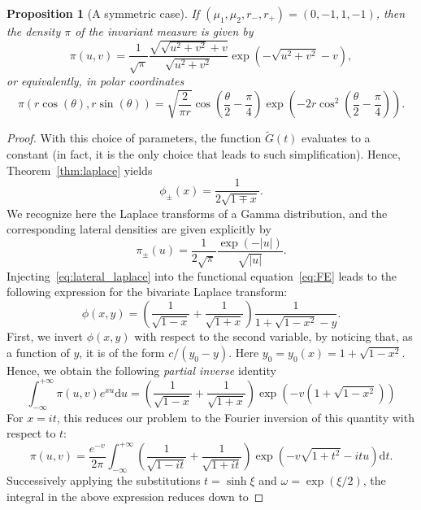 \documentclass{article}
\theoremstyle{plain}
\newtheorem{proposition}[theorem]{Proposition}
\theoremstyle{definition}
\theoremstyle{remark}
\begin{document}
\begin{proposition}[A symmetric case]\label{prop:ex} If $(\mu_1,\mu_2,r_-,r_+)=(0,-1,1,-1)$, then the density $\pi$ of the invariant measure is given by
$$\pi(u,v)=\frac{1}{\sqrt{\pi}}\frac{\sqrt{\sqrt{u^2+v^2}+v}}{\sqrt{u^2+v^2}}\exp\left(-\sqrt{u^2+v^2}-v\right),$$
or equivalently, in polar coordinates
$$\pi(r\cos(\theta),r\sin(\theta))=\sqrt{\frac{2}{\pi r}}\cos\left(\frac{\theta}{2}-\frac{\pi}{4}\right)\exp\left(-2r\cos^2\left(\frac{\theta}{2}-\frac{\pi}{4}\right)\right).$$
\end{proposition}

\begin{proof}
    With this choice of parameters, the function $\widetilde{G}(t)$ evaluates to a constant (in fact, it is the only choice that leads to such simplification). Hence, Theorem~\ref{thm:laplace} yields 
    \begin{equation}\label{eq:lateral_laplace}
        \phi_\pm(x)=\frac{1}{2\sqrt{1\mp x}}.
    \end{equation}
    We recognize here the Laplace transforms of a Gamma distribution, and the corresponding lateral densities are given explicitly by
    $$\pi_\pm(u)=\frac{1}{2\sqrt{\pi}}\frac{\exp(-|u|)}{\sqrt{|u|}}.$$
    Injecting~\eqref{eq:lateral_laplace} into the functional equation~\eqref{eq:FE} leads to the following expression for the bivariate Laplace transform:
    \begin{equation}\label{eq:laplace_symmetric}
    \phi(x,y)=\left(\frac{1}{\sqrt{1-x}}+\frac{1}{\sqrt{1+x}}\right)\frac{1}{1+\sqrt{1-x^2}-y}.
    \end{equation}
    First, we invert $\phi(x,y)$ with respect to the second variable, by noticing that, as a function of $y$, it is of the form $c/(y_0-y)$. Here $y_0= y_0(x)=1+\sqrt{1-x^2}$. Hence, we obtain the following \textit{partial inverse} identity
    \begin{equation*}
        \int_{-\infty}^{+\infty}\pi(u,v)e^{xu}\mathrm{d}u=\left(\frac{1}{\sqrt{1-x}}+\frac{1}{\sqrt{1+x}}\right)\exp\left(-v\left(1+\sqrt{1-x^2}\right)\right)
    \end{equation*}
    For $x=it$, this reduces our problem to the Fourier inversion of this quantity with respect to $t$:
    $$\pi(u,v)=\frac{e^{-v}}{2\pi}\int_{-\infty}^{+\infty}\left(\frac{1}{\sqrt{1-it}}+\frac{1}{\sqrt{1+it}}\right)\exp\left(-v\sqrt{1+t^2}-itu\right)\mathrm{d}t.$$
    Successively applying the substitutions $t=\sinh \xi$ and $\omega=\exp(\xi/2)$, the integral in the above expression reduces down to

\end{proof}
\end{document}
